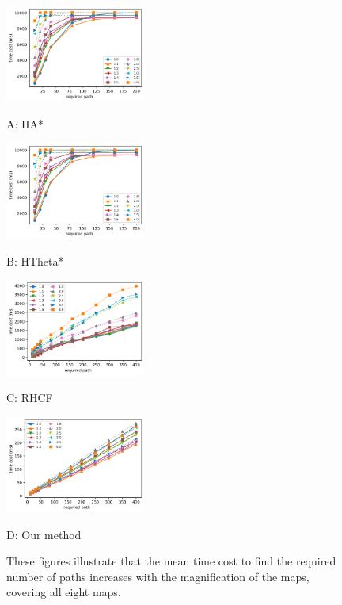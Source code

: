 \documentclass[letterpaper, 10 pt, journal, twoside]{IEEEtran}
\begin{document}
\begin{figure}[t] \scriptsize
\begin{minipage}{.245\linewidth}
  \centerline{\includegraphics[width=4.6cm]{HsAs_scale_cost_method_path_count.png}}
  \centerline{A: HA*}
\end{minipage}
\hfill
\begin{minipage}{.245\linewidth}
  \centerline{\includegraphics[width=4.6cm]{HsTs_scale_cost_method_path_count.png}}
  \centerline{B: HTheta*}
\end{minipage}
\hfill
\begin{minipage}{.245\linewidth}
  \centerline{\includegraphics[width=4.6cm]{RHCF_scale_cost_method_path_count.png}}
  \centerline{C: RHCF}
\end{minipage}
\hfill
\begin{minipage}{.245\linewidth}
  \centerline{\includegraphics[width=4.6cm]{RJ_scale_cost_method_path_count.png}}
  \centerline{D: Our method}
\end{minipage}
\vfill

\caption{These figures illustrate that the mean time cost to find the required number of paths increases with the magnification of the maps, covering all eight maps.}
\label{scale_cost_method_path_count}
\end{figure}
\end{document}
